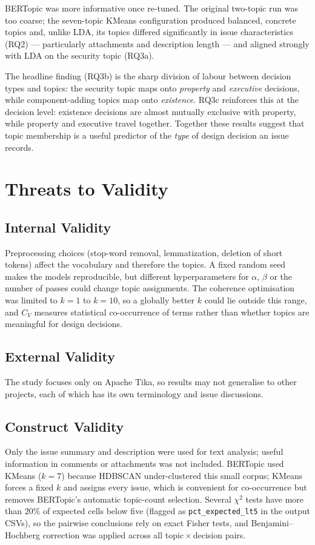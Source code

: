 \documentclass[11pt,a4paper]{report}
\begin{document}
BERTopic was more informative once re-tuned. The original two-topic run was too
coarse; the seven-topic KMeans configuration produced balanced, concrete topics
and, unlike LDA, its topics differed significantly in issue characteristics
(RQ2) --- particularly attachments and description length --- and aligned
strongly with LDA on the security topic (RQ3a).

The headline finding (RQ3b) is the sharp division of labour between decision
types and topics: the security topic maps onto \emph{property} and
\emph{executive} decisions, while component-adding topics map onto
\emph{existence}. RQ3c reinforces this at the decision level: existence
decisions are almost mutually exclusive with property, while property and
executive travel together. Together these results suggest that topic membership
is a useful predictor of the \emph{type} of design decision an issue records.

\chapter{Threats to Validity}
\section{Internal Validity}
Preprocessing choices (stop-word removal, lemmatization, deletion of short
tokens) affect the vocabulary and therefore the topics. A fixed random seed
makes the models reproducible, but different hyperparameters for $\alpha$,
$\beta$ or the number of passes could change topic assignments. The coherence
optimisation was limited to $k=1$ to $k=10$, so a globally better $k$ could lie
outside this range, and $C_V$ measures statistical co-occurrence of terms rather
than whether topics are meaningful for design decisions.

\section{External Validity}
The study focuses only on Apache Tika, so results may not generalise to other
projects, each of which has its own terminology and issue discussions.

\section{Construct Validity}
Only the issue summary and description were used for text analysis; useful
information in comments or attachments was not included. BERTopic used KMeans
($k=7$) because HDBSCAN under-clustered this small corpus; KMeans forces a fixed
$k$ and assigns every issue, which is convenient for co-occurrence but removes
BERTopic's automatic topic-count selection. Several $\chi^2$ tests have more than
$20\%$ of expected cells below five (flagged as \texttt{pct\_expected\_lt5} in
the output CSVs), so the pairwise conclusions rely on exact Fisher tests, and
Benjamini--Hochberg correction was applied across all topic\,$\times$\,decision
pairs.
\end{document}
